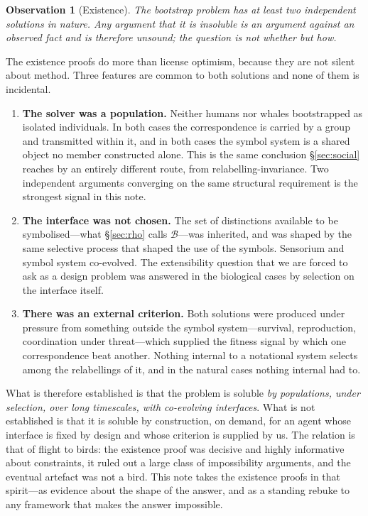 \documentclass[11pt,a4paper]{article}
\theoremstyle{definition}
\theoremstyle{plain}
\newtheorem{observation}[definition]{Observation}
\theoremstyle{remark}
\newcommand{\Bee}{\mathcal{B}}
\begin{document}
\begin{observation}[Existence]
\label{obs:soluble}
The bootstrap problem has at least two independent solutions in nature. Any argument that
it is insoluble is an argument against an observed fact and is therefore unsound; the
question is not whether but how.
\end{observation}

\noindent The existence proofs do more than license optimism, because they are not silent
about method. Three features are common to both solutions and none of them is incidental.

\begin{enumerate}[label=(\roman*),leftmargin=2.2em]
\item \textbf{The solver was a population.} Neither humans nor whales bootstrapped as
isolated individuals. In both cases the correspondence is carried by a group and
transmitted within it, and in both cases the symbol system is a shared object no member
constructed alone. This is the same conclusion \S\ref{sec:social} reaches by an entirely
different route, from relabelling-invariance. Two independent arguments converging on the
same structural requirement is the strongest signal in this note.
\item \textbf{The interface was not chosen.} The set of distinctions available to be
symbolised---what \S\ref{sec:rho} calls $\Bee$---was inherited, and was shaped by the same
selective process that shaped the use of the symbols. Sensorium and symbol system
co-evolved. The extensibility question that we are forced to ask as a design problem was
answered in the biological cases by selection on the interface itself.
\item \textbf{There was an external criterion.} Both solutions were produced under
pressure from something outside the symbol system---survival, reproduction, coordination
under threat---which supplied the fitness signal by which one correspondence beat another.
Nothing internal to a notational system selects among the relabellings of it, and in the
natural cases nothing internal had to.
\end{enumerate}

\noindent What is therefore established is that the problem is soluble \emph{by
populations, under selection, over long timescales, with co-evolving interfaces}. What is
not established is that it is soluble by construction, on demand, for an agent whose
interface is fixed by design and whose criterion is supplied by us. The relation is that
of flight to birds: the existence proof was decisive and highly informative about
constraints, it ruled out a large class of impossibility arguments, and the eventual
artefact was not a bird. This note takes the existence proofs in that spirit---as evidence
about the shape of the answer, and as a standing rebuke to any framework that makes the
answer impossible.
\end{document}
